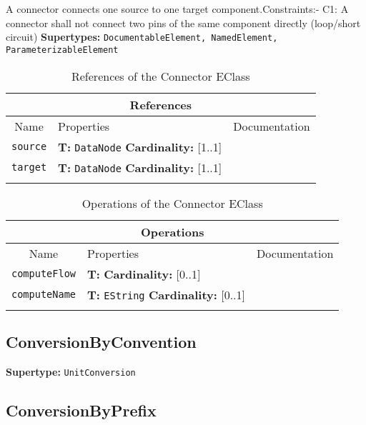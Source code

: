 \documentclass{article}
\begin{document}
A connector connects one source to one target component.Constraints:- C1: A connector shall not connect two pins of the same component directly (loop/short circuit)
\textbf{Supertypes: }\texttt{DocumentableElement, NamedElement, ParameterizableElement}
\begin{table}[H]
\footnotesize
\begin{tabularx}{\textwidth}{|c| p{4 cm} | X |}
\hline
\multicolumn{3}{|c|}{\textbf{References}} \\
\hline
Name & Properties & Documentation \\ \hline \hline
\texttt{source}
 & 
\textbf{T:} \texttt{DataNode}
\newline
\textbf{Cardinality:} [1..1]
 & \\ \hline
\texttt{target}
 & 
\textbf{T:} \texttt{DataNode}
\newline
\textbf{Cardinality:} [1..1]
 & \\ \hline
\caption{References of the Connector EClass}
\end{tabularx}
\label{e4smConnectorref}
\end{table}
\begin{table}[H]
\footnotesize
\begin{tabularx}{\textwidth}{|c| p{4 cm} | X |}
\hline
\multicolumn{3}{|c|}{\textbf{Operations}} \\
\hline
Name & Properties & Documentation \\ \hline \hline
\texttt{computeFlow}
 & 
\textbf{T:} \texttt{}
\newline
\textbf{Cardinality:} [0..1]
 & \\ \hline
\texttt{computeName}
 & 
\textbf{T:} \texttt{EString}
\newline
\textbf{Cardinality:} [0..1]
 & \\ \hline
\caption{Operations of the Connector EClass}
\end{tabularx}
\label{e4smConnectorop}
\end{table}
\subsection[ConversionByConvention]{ConversionByConvention}
\label{e4smConversionByConvention}

\textbf{Supertype: }\texttt{UnitConversion}
\subsection[ConversionByPrefix]{ConversionByPrefix}
\label{e4smConversionByPrefix}
\end{document}
